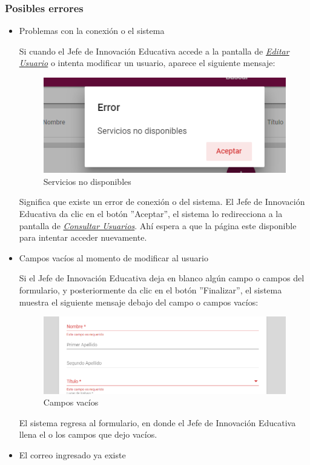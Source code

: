 \subsubsection{Posibles errores}
\begin{itemize}
	\item Problemas con la conexión o el sistema

	Si cuando el Jefe de Innovación Educativa accede a la pantalla de \hyperlink{editarUs-JIE}{\textit{Editar Usuario}} o intenta modificar un usuario, aparece el siguiente mensaje:
	
	\begin{figure}[H]
		\centering
		\includegraphics[width=0.4\linewidth]{images/SP5/MSGSN}
		\caption{Servicios no disponibles}

	\end{figure}


	Significa que existe un error de conexión o del sistema. El Jefe de Innovación Educativa da clic en el botón ''Aceptar'', el sistema lo redirecciona  a la pantalla de \hyperlink{consultarUs-JIE}{\textit{Consultar Usuarios}}. Ahí  espera a que la página este disponible para intentar acceder nuevamente.

	\item Campos vacíos al momento de modificar al usuario

	Si el Jefe de Innovación Educativa deja en blanco algún campo o campos del formulario, y posteriormente da clic en el botón ''Finalizar'', el sistema muestra el siguiente mensaje debajo del campo o campos vacíos:

	\begin{figure}[H]
		\centering
		\includegraphics[width=0.4\linewidth]{images/SP5/MSG44}
		\caption{Campos vacíos}
		\label{mensaje44-JIE}

	\end{figure}

	El sistema regresa  al formulario, en donde el Jefe de Innovación Educativa llena el o los campos que dejo vacíos.
	\item El correo ingresado ya existe


\end{itemize}

